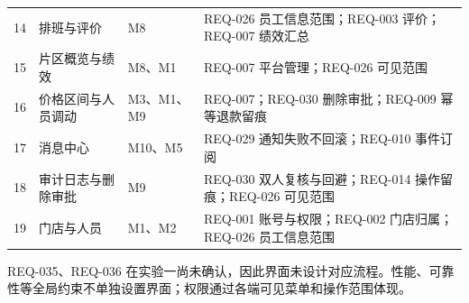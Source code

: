 {\begin{xltabular}{\textwidth}{@{}L{0.6cm}L{3.3cm}L{2.4cm}X@{}}
14 & 排班与评价 & M8 & REQ-026 员工信息范围；REQ-003 评价；REQ-007 绩效汇总 \\
15 & 片区概览与绩效 & M8、M1 & REQ-007 平台管理；REQ-026 可见范围 \\
16 & 价格区间与人员调动 & M3、M1、M9 & REQ-007；REQ-030 删除审批；REQ-009 幂等退款留痕 \\
17 & 消息中心 & M10、M5 & REQ-029 通知失败不回滚；REQ-010 事件订阅 \\
18 & 审计日志与删除审批 & M9 & REQ-030 双人复核与回避；REQ-014 操作留痕；REQ-026 可见范围 \\
19 & 门店与人员 & M1、M2 & REQ-001 账号与权限；REQ-002 门店归属；REQ-026 员工信息范围 \\
\end{xltabular}
}

REQ-035、REQ-036 在实验一尚未确认，因此界面未设计对应流程。性能、可靠性等全局约束不单独设置界面；权限通过各端可见菜单和操作范围体现。
